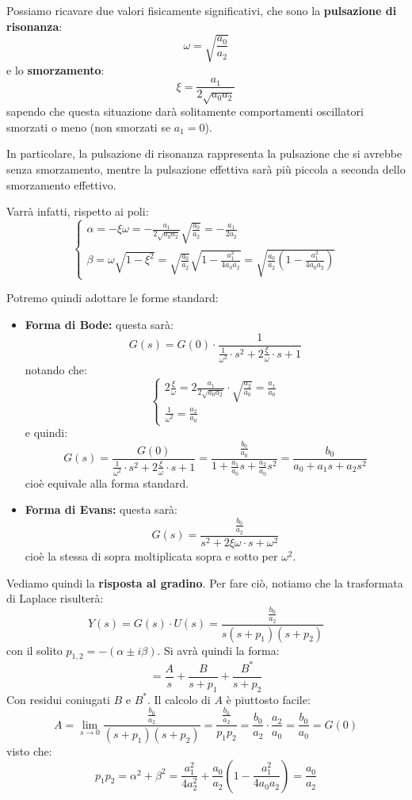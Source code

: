 \documentclass[a4paper,11pt]{article}
\begin{document}
Possiamo ricavare due valori fisicamente significativi, che sono la \textbf{pulsazione di risonanza}:
$$
\omega = \sqrt{\frac{a_0}{a_2}}
$$
e lo \textbf{smorzamento}:
$$
\xi = \frac{a_1}{2 \sqrt{a_0 a_2}}
$$
sapendo che questa situazione darà solitamente comportamenti oscillatori smorzati o meno (non smorzati se $a_1 = 0$).

In particolare, la pulsazione di risonanza rappresenta la pulsazione che si avrebbe senza smorzamento, mentre la pulsazione effettiva sarà più piccola a seconda dello smorzamento effettivo. 

Varrà infatti, rispetto ai poli:
\[
	\begin{cases}
		\alpha = -\xi \omega = - \frac{a_1}{2 \sqrt{a_0 a_2}} \sqrt{ \frac{a_0}{a_2} } = -\frac{a_1}{2 a_2} \\
		\beta = \omega \sqrt{1 - \xi^2} = \sqrt{ \frac{a_0}{a_2} } \sqrt{ 1 - \frac{a_1^2}{4 a_0 a_2} } = \sqrt{ \frac{a_0}{a_2} \left( 1 - \frac{a_1^2}{4 a_0 a_2} \right) }
	\end{cases}
\]

Potremo quindi adottare le forme standard:
\begin{itemize}
	\item \textbf{Forma di Bode:} questa sarà:
$$
G(s) = G(0) \cdot \frac{ 1 }{ \frac{1}{\omega^2} \cdot s^2 + 2 \frac{\xi}{\omega} \cdot s + 1 }
$$
notando che:
\[
	\begin{cases}
		2 \frac{\xi}{\omega} = 2 \frac{a_1}{2 \sqrt{a_0 a_2}} \cdot \sqrt{\frac{a_2}{a_0}} = \frac{a_1}{a_0} \\
		\frac{1}{\omega^2} = \frac{a_2}{a_0}
	\end{cases}
\]
e quindi:
$$
G(s) = \frac{ G(0) }{ \frac{1}{\omega^2} \cdot s^2 + 2 \frac{\xi}{\omega} \cdot s + 1 } = \frac{ \frac{b_0}{a_0} }{ 1 + \frac{a_1}{a_0} s + \frac{a_2}{a_0} s^2} = \frac{b_0}{a_0 + a_1 s + a_2 s^2}
$$
cioè equivale alla forma standard.
	\item \textbf{Forma di Evans:} questa sarà:
$$
G(s) = \frac{ \frac{b_0}{a_2} }{ s^2 + 2 \xi \omega \cdot s + \omega^2 }
$$
cioè la stessa di sopra moltiplicata sopra e sotto per $\omega^2$.
\end{itemize}

Vediamo quindi la \textbf{risposta al gradino}.
Per fare ciò, notiamo che la trasformata di Laplace risulterà:
$$
Y(s) = G(s) \cdot U(s) = \frac{\frac{b_0}{a_2}}{s (s + p_1) (s + p_2)}
$$
con il solito $p_{1, 2} = -(\alpha \pm i \beta)$.
Si avrà quindi la forma:
$$
= \frac{A}{s} + \frac{B}{s + p_1} + \frac{B^*}{s + p_2}
$$
Con residui coniugati $B$ e $B^*$.
Il calcolo di $A$ è piuttosto facile:
$$
A = \lim_{s \rightarrow 0} \frac{ \frac{b_0}{a_2} }{ (s + p_1) (s + p_2) } = \frac{ \frac{b_0}{a_2} }{p_1 p_2} = \frac{b_0}{a_2} \cdot \frac{a_2}{a_0} = \frac{b_0}{a_0} = G(0)
$$
visto che:
$$
p_1 p_2 = \alpha^2 + \beta^2 = \frac{a_1^2}{4 a_2^2} + \frac{a_0}{a_2} \left( 1 - \frac{a_1^2}{4 a_0 a_2} \right) = \frac{a_0}{a_2}
$$
\end{document}
